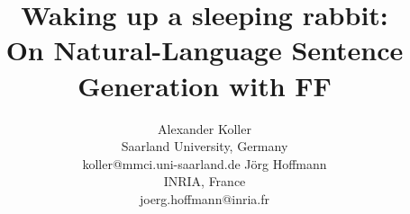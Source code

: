 \documentclass[letterpaper]{article}
\begin{document}
\title{Waking up a sleeping rabbit:\\ On Natural-Language Sentence Generation with FF}

\author{
Alexander Koller \\ Saarland University, Germany \\ koller@mmci.uni-saarland.de
\And
J\"org Hoffmann \\ INRIA, France \\ joerg.hoffmann@inria.fr
}

\nocopyright

\maketitle










{\small


}
\end{document}
